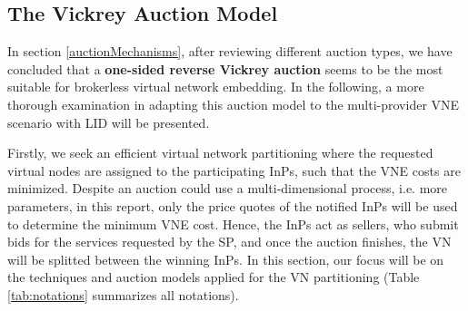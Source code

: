 \subsection{The Vickrey Auction Model} \label{vickrey}

In section \ref{auctionMechanisms}, after reviewing different auction types, we have concluded that a \textbf{one-sided reverse Vickrey auction} seems to be the most suitable for brokerless virtual network embedding. In the following, a more thorough examination in adapting this auction model to the multi-provider VNE scenario with LID will be presented.

Firstly, we seek an efficient virtual network partitioning where the requested virtual nodes are assigned to the participating InPs, such that the VNE costs are minimized. Despite an auction could use a multi-dimensional process, i.e. more parameters, in this report, only the price quotes of the notified InPs will be used to determine the minimum VNE cost. Hence, the InPs act as sellers, who submit bids for the services requested by the SP, and once the auction finishes, the VN will be splitted between the winning InPs. In this section, our focus will be on the techniques and auction models applied for the VN partitioning (Table \ref{tab:notations} summarizes all notations).

